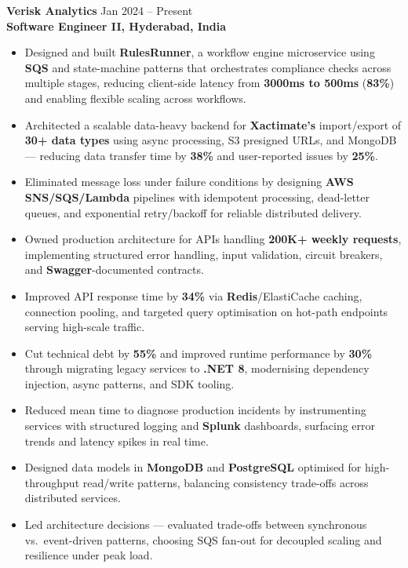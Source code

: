 \documentclass[a4paper,10pt]{article}
\begin{document}
\textbf{Verisk Analytics} \hfill Jan 2024 -- Present \\
\textbf{Software Engineer II, Hyderabad, India}
\begin{itemize}[leftmargin=*]
    \item Designed and built \textbf{RulesRunner}, a workflow engine microservice using \textbf{SQS} and state-machine patterns that orchestrates compliance checks across multiple stages, reducing client-side latency from \textbf{3000ms to 500ms} (\textbf{83\%}) and enabling flexible scaling across workflows.
    \item Architected a scalable data-heavy backend for \textbf{Xactimate's} import/export of \textbf{30+ data types} using async processing, S3 presigned URLs, and MongoDB — reducing data transfer time by \textbf{38\%} and user-reported issues by \textbf{25\%}.
    \item Eliminated message loss under failure conditions by designing \textbf{AWS SNS/SQS/Lambda} pipelines with idempotent processing, dead-letter queues, and exponential retry/backoff for reliable distributed delivery.
    \item Owned production architecture for APIs handling \textbf{200K+ weekly requests}, implementing structured error handling, input validation, circuit breakers, and \textbf{Swagger}-documented contracts.
    \item Improved API response time by \textbf{34\%} via \textbf{Redis}/ElastiCache caching, connection pooling, and targeted query optimisation on hot-path endpoints serving high-scale traffic.
    \item Cut technical debt by \textbf{55\%} and improved runtime performance by \textbf{30\%} through migrating legacy services to \textbf{.NET 8}, modernising dependency injection, async patterns, and SDK tooling.
    \item Reduced mean time to diagnose production incidents by instrumenting services with structured logging and \textbf{Splunk} dashboards, surfacing error trends and latency spikes in real time.
    \item Designed data models in \textbf{MongoDB} and \textbf{PostgreSQL} optimised for high-throughput read/write patterns, balancing consistency trade-offs across distributed services.
    \item Led architecture decisions — evaluated trade-offs between synchronous vs.\ event-driven patterns, choosing SQS fan-out for decoupled scaling and resilience under peak load.
\end{itemize}
\end{document}

